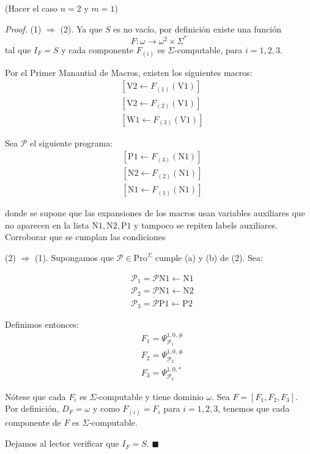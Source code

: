 \documentclass{article}
\begin{document}
\medskip

(Hacer el caso $n = 2$ y $m = 1$)
\medskip

\textit{Proof.} (1) $\Rightarrow$ (2). Ya que $S$ es no vacío, por definición existe una función 
\[
F : \omega \to \omega^2 \times \Sigma^*
\]
tal que $I_F = S$ y cada componente $F_{(i)}$ es $\Sigma$-computable, para $i = 1, 2, 3$.

Por el Primer Manantial de Macros, existen los siguientes macros:
\[
\begin{aligned}
&[\text{V2} \leftarrow F_{(1)}(\text{V1})] \\
&[\text{V2} \leftarrow F_{(2)}(\text{V1})] \\
&[\text{W1} \leftarrow F_{(3)}(\text{V1})]
\end{aligned}
\]

Sea $\mathcal{P}$ el siguiente programa:
\[
\begin{aligned}
&[\text{P}1 \leftarrow F_{(3)}(\text{N1})] \\
&[\text{N2} \leftarrow F_{(2)}(\text{N1})] \\
&[\text{N1} \leftarrow F_{(1)}(\text{N1})]
\end{aligned}
\]

donde se supone que las expansiones de los macros usan variables auxiliares que no aparecen en la lista $\text{N1}, \text{N2}, \text{P1}$ y tampoco se repiten labels auxiliares.\\
Corroborar que se cumplan las condiciones

(2) $\Rightarrow$ (1). Supongamos que $\mathcal{P} \in \text{Pro}^\Sigma$ cumple (a) y (b) de (2). Sea:

\[
\begin{aligned}
&\mathcal{P}_1 = \mathcal{P} \text{N1} \leftarrow \text{N1} \\
&\mathcal{P}_2 = \mathcal{P} \text{N1} \leftarrow \text{N2} \\
&\mathcal{P}_3 = \mathcal{P}\text{P1} \leftarrow \text{P2}
\end{aligned}
\]

Definimos entonces:
\[
\begin{aligned}
&F_1 = \Psi^{1,0,\#}_{\mathcal{P}_1} \\
&F_2 = \Psi^{1,0,\#}_{\mathcal{P}_2} \\
&F_3 = \Psi^{1,0,*}_{\mathcal{P}_3}
\end{aligned}
\]

Nótese que cada $F_i$ es $\Sigma$-computable y tiene dominio $\omega$. Sea $F = [F_1, F_2, F_3]$. Por definición, $D_F = \omega$ y como $F_{(i)} = F_i$ para $i = 1, 2, 3$, tenemos que cada componente de $F$ es $\Sigma$-computable.

Dejamos al lector verificar que $I_F = S$. \hfill $\blacksquare$
\end{document}
